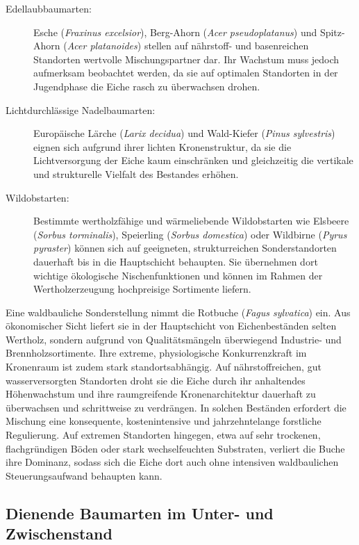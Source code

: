 \documentclass[twocolumn, bibliography=totoc, abstract=true]{scrartcl}
\begin{document}
\begin{description}
\item[Edellaubbaumarten:] Esche (\textit{Fraxinus excelsior}), Berg-Ahorn (\textit{Acer pseudoplatanus}) und Spitz-Ahorn (\textit{Acer platanoides}) stellen auf nährstoff- und basenreichen Standorten wertvolle Mischungspartner dar. Ihr Wachstum muss jedoch aufmerksam beobachtet werden, da sie auf optimalen Standorten in der Jugendphase die Eiche rasch zu überwachsen drohen.
\item[Lichtdurchlässige Nadelbaumarten:] Europäische Lärche (\textit{Larix decidua}) und Wald-Kiefer (\textit{Pinus sylvestris}) eignen sich aufgrund ihrer lichten Kronenstruktur, da sie die Lichtversorgung der Eiche kaum einschränken und gleichzeitig die vertikale und strukturelle Vielfalt des Bestandes erhöhen.
\item[Wildobstarten:] Bestimmte wertholzfähige und wärmeliebende Wildobstarten wie Elsbeere (\textit{Sorbus torminalis}), Speierling (\textit{Sorbus domestica}) oder Wildbirne (\textit{Pyrus pyraster}) können sich auf geeigneten, strukturreichen Sonderstandorten dauerhaft bis in die Hauptschicht behaupten. Sie übernehmen dort wichtige ökologische Nischenfunktionen und können im Rahmen der Wertholzerzeugung hochpreisige Sortimente liefern.
\end{description}

Eine waldbauliche Sonderstellung nimmt die Rotbuche (\textit{Fagus sylvatica}) ein. Aus ökonomischer Sicht liefert sie in der Hauptschicht von Eichenbeständen selten Wertholz, sondern aufgrund von Qualitätsmängeln überwiegend Industrie- und Brennholzsortimente. Ihre extreme, physiologische Konkurrenzkraft im Kronenraum ist zudem stark standortsabhängig. Auf nährstoffreichen, gut wasserversorgten Standorten droht sie die Eiche durch ihr anhaltendes Höhenwachstum und ihre raumgreifende Kronenarchitektur dauerhaft zu überwachsen und schrittweise zu verdrängen. In solchen Beständen erfordert die Mischung eine konsequente, kostenintensive und jahrzehntelange forstliche Regulierung. Auf extremen Standorten hingegen, etwa auf sehr trockenen, flachgründigen Böden oder stark wechselfeuchten Substraten, verliert die Buche ihre Dominanz, sodass sich die Eiche dort auch ohne intensiven waldbaulichen Steuerungsaufwand behaupten kann.

\subsection{Dienende Baumarten im Unter- und Zwischenstand}
\end{document}
